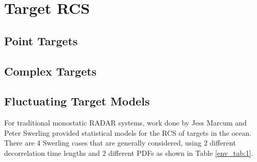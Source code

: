 \section{Target RCS}
\subsection{Point Targets}
\subsection{Complex Targets}
\subsection{Fluctuating Target Models}
For traditional monostatic RADAR systems, work done by Jess Marcum and Peter Swerling provided statistical models for the RCS of targets in the ocean\cite{richards_radar}. There are $4$ Swerling cases that are generally considered, using $2$ different decorrelation time lengths and $2$ different PDFs as shown in Table \ref{env_tab:1}. 

